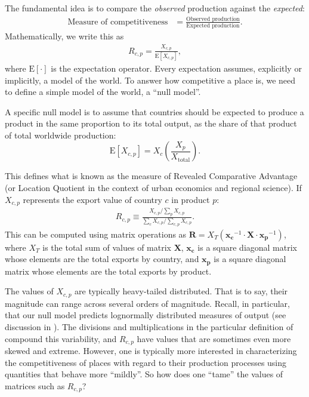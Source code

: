 \documentclass[12pt]{article}
\newcommand{\mtx}[1]{\mathbf{ #1}}
\newcommand{\E}[1]{{\mathrm E}\left[ #1 \right]}
\begin{document}
The fundamental idea is to compare the \emph{observed} production against the \emph{expected}:
\begin{align}
	\text{Measure of competitiveness}&=\frac{\text{Observed production}}{\text{Expected production}}.
\end{align}
Mathematically, we write this as
\begin{align}
	R_{c,p} = \frac{X_{c,p}}{\E{X_{c,p}}},
\label{eq_observedexpected}
\end{align}
where $\E{\cdot}$ is the expectation operator. Every expectation assumes, explicitly or implicitly, a model of the world. To answer how competitive a place is, we need to define a simple model of the world, a ``null model''. 

A specific null model is to assume that countries should be expected to produce a product in the same proportion to its total output, as the share of that product of total worldwide production: $$\E{X_{c,p}} = X_c \left(\frac{X_p}{X_{\text{total}}}\right).$$

This defines what is known as the measure of Revealed Comparative Advantage (or Location Quotient in the context of urban economics and regional science). If $X_{c,p}$ represents the export value of country $c$ in product $p$:
\begin{align}
	R_{c,p}\equiv \frac{X_{c,p}/\sum_p X_{c,p}}{\sum_c X_{c,p}/\sum_{c,p} X_{c,p}}.
\label{eq_rcadef}
\end{align}
This can be computed using matrix operations as $\mtx{R} = X_T (\mtx{x_c}^{-1}\cdot \mtx{X} \cdot \mtx{x_p}^{-1})$, where $X_T$ is the total sum of values of matrix $\mtx{X}$, $\mtx{x_c}$ is a square diagonal matrix whose elements are the total exports by country, and $\mtx{x_p}$ is a square diagonal matrix whose elements are the total exports by product.

The values of $X_{c,p}$ are typically heavy-tailed distributed. That is to say, their magnitude can range across several orders of magnitude. Recall, in particular, that our null model predicts lognormally distributed measures of output (see discussion in ). The divisions and multiplications in the particular definition of  compound this variability, and $R_{c,p}$ have values that are sometimes even more skewed and extreme. However, one is typically more interested in characterizing the competitiveness of places with regard to their production processes using quantities that behave more ``mildly''. So how does one ``tame'' the values of matrices such as $R_{c,p}$?
\end{document}
